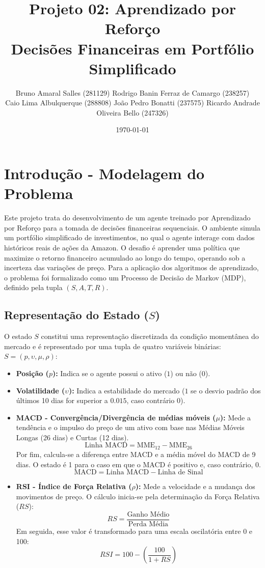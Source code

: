 \documentclass{article}
\title{Projeto 02: Aprendizado por Reforço\\ \large Decisões Financeiras em Portfólio Simplificado}
\author{
  \small
  Bruno Amaral Salles (281129) \textbullet{} Rodrigo Banin Ferraz de Camargo (238257) \\
  \small
    Caio Lima Albulquerque (288808) \textbullet{} João Pedro Bonatti (237575) \textbullet{} Ricardo Andrade Oliveira Bello (247326)
  \date{\small\today}
}
\begin{document}
\maketitle

\section{Introdução - Modelagem do Problema}
Este projeto trata do desenvolvimento de um agente treinado por Aprendizado por Reforço para a tomada de decisões financeiras sequenciais. O ambiente simula um portfólio simplificado de investimentos, no qual o agente interage com dados históricos reais de ações da Amazon. O desafio é aprender uma política que maximize o retorno financeiro acumulado ao longo do tempo, operando sob a incerteza das variações de preço. Para a aplicação dos algoritmos de aprendizado, o problema foi formalizado como um Processo de Decisão de Markov (MDP), definido pela tupla $(S, A, T, R)$.

\subsection{Representação do Estado ($S$)}
O estado $S$ constitui uma representação discretizada da condição momentânea do mercado e é representado por uma tupla de quatro variáveis binárias: $S = (p, \upsilon, \mu, \rho)$:
\begin{itemize}
    \item \textbf{Posição ($p$):} Indica se o agente possui o ativo ($1$) ou não ($0$).

    \item \textbf{Volatilidade ($\upsilon$):} Indica a estabilidade do mercado ($1$ se o desvio padrão dos últimos 10 dias for superior a $0.015$, caso contrário $0$).

    \item \textbf{MACD - Convergência/Divergência de médias móveis ($\mu$):} Mede a tendência e o impulso do preço de um ativo com base nas Médias Móveis Longas (26 dias) e Curtas (12 dias).
    \begin{equation}
        \text{Linha MACD} = \text{MME}_{12} - \text{MME}_{26}
    \end{equation}
    Por fim, calcula-se a diferença entre MACD e a média móvel do MACD de 9 dias. O estado é 1 para o caso em que o MACD é positivo e, caso contrário, 0.
    \begin{equation}
        \text{MACD} = \text{Linha MACD} - \text{Linha de Sinal}
    \end{equation}
    \item \textbf{RSI - Índice de Força Relativa ($\rho$):} Mede a velocidade e a mudança dos movimentos de preço. O cálculo inicia-se pela determinação da Força Relativa ($RS$):
    \begin{equation}
        RS = \frac{\text{Ganho Médio}}{\text{Perda Média}}
    \end{equation}
    Em seguida, esse valor é transformado para uma escala oscilatória entre 0 e 100:
    \begin{equation}
        RSI = 100 - \left( \frac{100}{1 + RS} \right)
    \end{equation}
\end{itemize}
\end{document}
